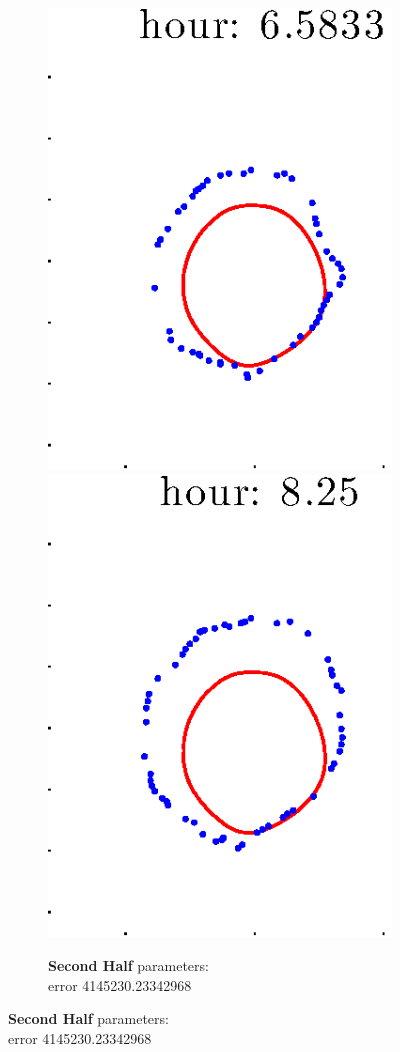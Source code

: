 \documentclass[12pt]{article}
\begin{document}
\begin{figure}[h!]
\begin{subfigure}[b]{.3\textwidth}
		\includegraphics[height=.15\textheight]{Pos14exp8/full/second5.eps}
		\includegraphics[height=.15\textheight]{Pos14exp8/full/second6.eps}
		\caption{\textbf{Second Half} parameters: \\error 4145230.23342968}
	\end{subfigure}
\end{figure}
\end{document}
